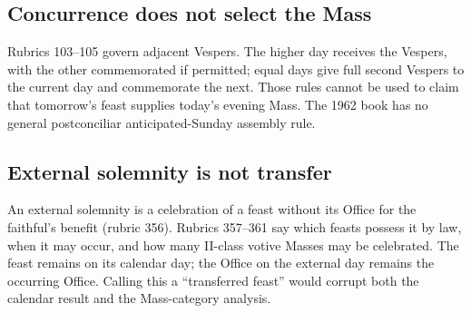 \subsection{Concurrence does not select the Mass}

Rubrics 103--105 govern adjacent Vespers. The higher day receives the Vespers, with the other commemorated if permitted; equal days give full second Vespers to the current day and commemorate the next. Those rules cannot be used to claim that tomorrow's feast supplies today's evening Mass. The 1962 book has no general postconciliar anticipated-Sunday assembly rule.

\subsection{External solemnity is not transfer}

An external solemnity is a celebration of a feast without its Office for the faithful's benefit (rubric 356). Rubrics 357--361 say which feasts possess it by law, when it may occur, and how many II-class votive Masses may be celebrated. The feast remains on its calendar day; the Office on the external day remains the occurring Office. Calling this a “transferred feast” would corrupt both the calendar result and the Mass-category analysis.
